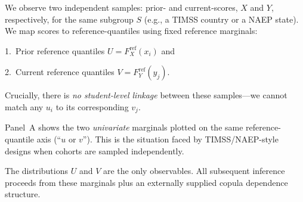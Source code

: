 \documentclass[10pt]{article}
\begin{document}
\noindent
\begin{minipage}[t]{3.75in}
  \vspace{0.05in}
  \hspace{0.15in}%
  \begin{minipage}{3.45in}
    \small\raggedright\color{bodyGrey}

    We observe two independent samples: prior- and current-scores, $X$ and $Y$, 
    respectively, for the same subgroup $S$ (e.g., a TIMSS country or a NAEP state). 
    We map scores to reference-quantiles using fixed reference marginals:

    \vspace{4pt}
    \hspace{5pt}1.~Prior reference quantiles $U = F_X^{\mathrm{ref}}(x_i)$ and

    \vspace{1pt}
    \hspace{5pt}2.~Current reference quantiles $V = F_Y^{\mathrm{ref}}(y_j)$.

    \vspace{4pt}
    Crucially, there is \emph{no student-level linkage} between these 
    samples---we cannot match any $u_i$ to its corresponding $v_j$.

    \vspace{4pt}
    Panel~A shows the two \emph{univariate} marginals plotted on the same 
    reference-quantile axis (``$u$ or $v$''). This is the situation 
    faced by TIMSS/NAEP-style designs when cohorts are sampled independently.

    \vspace{4pt}
    The distributions $U$ and $V$ are the only observables. All subsequent 
    inference proceeds from these marginals plus an externally supplied 
    copula dependence structure.

  \end{minipage}
  \vspace{0.1in}
\end{minipage}
\end{document}
